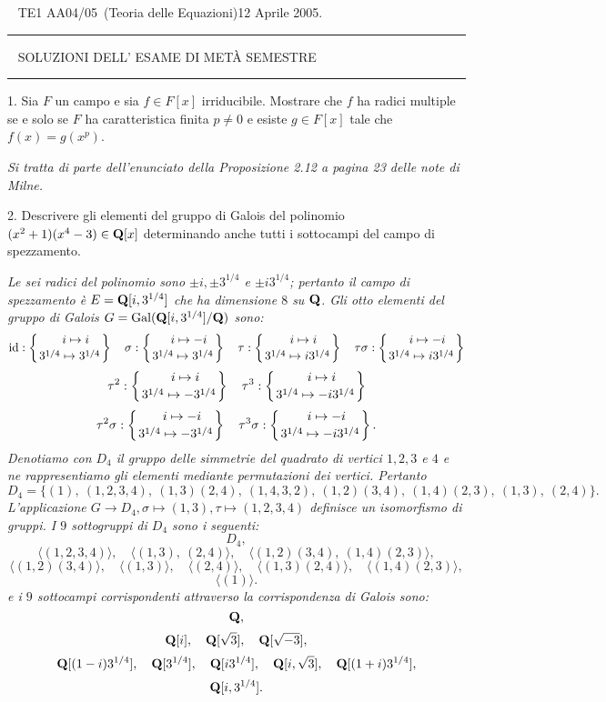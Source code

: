 
 \ \hskip -6mm TE1 AA04/05\ (Teoria delle
Equazioni)\hfill 12 Aprile 2005. \hrule
\bigskip
\ \hskip -6mm \hfill SOLUZIONI DELL' ESAME DI MET\`{A} SEMESTRE
\hfill \ \
\medskip\hrule
\bigskip

\item{1.} Sia $F$ un campo e sia $f\in F[x]$ irriducibile. Mostrare
che $f$ ha radici multiple se e solo se $F$ ha caratteristica finita
$p\neq0$ e esiste $g\in F[x]$ tale che $f(x)=g(x^p)$.

\smallskip{} \it Si tratta di parte dell'enunciato della Proposizione 2.12
a pagina 23 delle note di Milne.\rm
\bigskip

\item{2.} Descrivere gli elementi del gruppo di Galois del
polinomio $(x^2+1)(x^4-3)\in{\bf Q}[x]$ determinando anche tutti i
sottocampi del campo di spezzamento.

\smallskip{} \it Le sei radici del polinomio sono
$\pm i,\pm3^{1/4}$ e $\pm i3^{1/4}$; pertanto il campo di spezzamento
\`{e} $E={\bf Q}[i,3^{1/4}]$ che ha dimensione $8$ su ${\bf Q}$. Gli
otto elementi del gruppo di Galois $G={\rm Gal}({\bf
Q}[i,3^{1/4}]/{\bf Q})$ sono:
$$
{\rm id}:\left\{{\quad i\mapsto i\atop3^{1/4}\mapsto3^{1/4}}
\right\}\quad
\sigma:\left\{{\quad i\mapsto-i\atop3^{1/4}\mapsto3^{1/4}}
\right\}\quad
\tau:\left\{{\quad i\mapsto i\atop3^{1/4}\mapsto i3^{1/4}}
\right\}\quad
\tau\sigma:\left\{{\quad i\mapsto-i\atop3^{1/4}\mapsto i3^{1/4}}
\right\}$$
$$
\tau^2:\left\{{\quad i\mapsto i\atop3^{1/4}\mapsto -3^{1/4}}
\right\}\quad
\tau^3:\left\{{\quad i\mapsto i\atop3^{1/4}\mapsto -i3^{1/4}}
\right\}$$
$$\tau^2\sigma:\left\{{\quad i\mapsto -i\atop3^{1/4}\mapsto -3^{1/4}}
\right\}\quad
\tau^3\sigma:\left\{{\quad i\mapsto-i\atop3^{1/4}\mapsto -i3^{1/4}}
\right\}.$$
Denotiamo con $D_4$ il gruppo delle simmetrie del quadrato di
vertici $1,2,3$ e $4$ e ne rappresentiamo gli elementi mediante
permutazioni dei vertici. Pertanto
$$D_4=\big\{(1),\ (1,2,3,4),\ (1,3)(2,4),\ (1,4,3,2),\ (1,2)(3,4),\ (1,4)(2,3),\ (1,3),\ (2,4)\}.$$
L'applicazione $G\longrightarrow D_4, \sigma\mapsto(1,3),\tau\mapsto(1,2,3,4)$ definisce un isomorfismo di
gruppi. I $9$ sottogruppi di $D_4$ sono i seguenti:
$$D_4,$$
$$\langle(1,2,3,4)\rangle,\quad
\langle(1,3),\ (2,4)\rangle,\quad
\langle(1,2)(3,4),\ (1,4)(2,3)\rangle,
$$
$$\langle(1,2)(3,4)\rangle,\quad
\langle(1,3)\rangle,\quad
\langle(2,4)\rangle,\quad
\langle(1,3)(2,4)\rangle,\quad
\langle(1,4)(2,3)\rangle,$$
$$\langle(1)\rangle.$$
e i $9$ sottocampi corrispondenti attraverso la corrispondenza di Galois sono:
$${\bf Q},$$
$${\bf Q}[i],\quad
{\bf Q}[\sqrt{3}],\quad
{\bf Q}[\sqrt{-3}],$$
$$
{\bf Q}[(1-i)3^{1/4}],\quad
{\bf Q}[3^{1/4}],\quad
{\bf Q}[i3^{1/4}],\quad
{\bf Q}[i,\sqrt{3}],\quad
{\bf Q}[(1+i)3^{1/4}],$$
$${\bf Q}[i,3^{1/4}].$$
\rm
\bigskip

